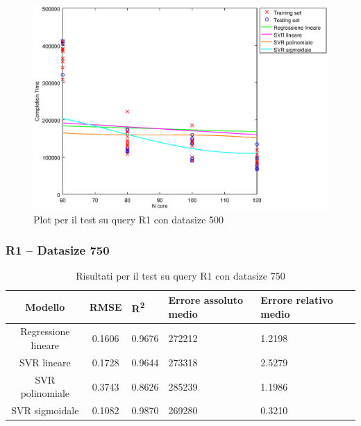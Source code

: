 \documentclass[a4paper,11pt]{article}
\begin{document}
\begin {figure}[hbt]
\centering
\includegraphics[width=\textwidth]{output/R1_500/plot_R1_500.eps}
\caption {Plot per il test su query R1 con datasize 500}
\end {figure}

\newpage

\newpage
\subsubsection{R1 -- Datasize 750}

\begin{table}[bhpt]
	\centering
	\begin{adjustbox}{center}
		\begin{tabular}{c | c M{1cm} M{2.5cm} M{2.5cm} M{1.8cm}}
			Modello & RMSE & R\textsuperscript{2} & Errore assoluto medio & Errore relativo medio \tabularnewline
			\hline
			Regressione lineare & 0.1606 & 0.9676 & 272212 & 1.2198 \\
			SVR lineare & 0.1728 & 0.9644 & 273318 & 2.5279 \\
			SVR polinomiale & 0.3743 & 0.8626 & 285239 & 1.1986 \\
			SVR sigmoidale & 0.1082 & 0.9870 & 269280 & 0.3210 \\
		\end{tabular}
	\end{adjustbox}
	\\
	\caption{Risultati per il test su query R1 con datasize 750}
	\label{table_R1_750}
\end{table}
\end{document}
